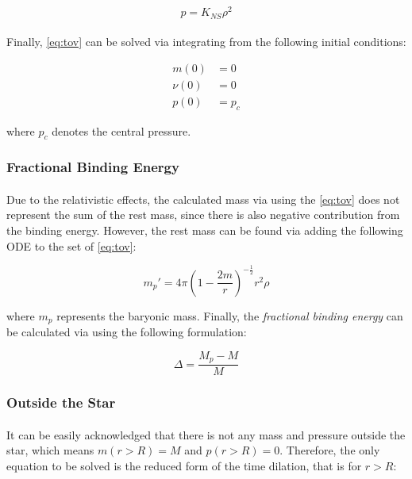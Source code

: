 \documentclass[letterpaper,12pt]{article}
\begin{document}
\begin{equation*}
    p = K_{NS} \rho ^ 2
\end{equation*}

\paragraph{} Finally, \eqref{eq:tov} can be solved via integrating from the following initial conditions:

\begin{equation*}
    \begin{aligned}
        m(0) &= 0\\
        \nu(0) &= 0\\
        p(0) &= p_c
    \end{aligned}
\end{equation*}

where $p_c$ denotes the central pressure.

\subsubsection{Fractional Binding Energy}

\paragraph{} Due to the relativistic effects, the calculated mass via using the \eqref{eq:tov} does not represent the sum of the rest mass, since there is also negative contribution from the binding energy. However, the rest mass can be found via adding the following ODE to the set of \eqref{eq:tov}:

\begin{equation*}
    m_p' = 4 \pi \left(1 - \frac{2m}{r}\right)^{-\frac{1}{2}}r^2\rho
\end{equation*}

where $m_p$ represents the baryonic mass. Finally, the \textit{fractional binding energy} can be calculated via using the following formulation:

\begin{equation*}
    \Delta = \frac{M_p - M}{M}
\end{equation*}

\subsubsection{Outside the Star}
\paragraph{} It can be easily acknowledged that there is not any mass and pressure outside the star, which means $m(r>R) = M$ and $p(r>R) = 0$. Therefore, the only equation to be solved is the reduced form of the time dilation, that is for $r>R$:
\end{document}
